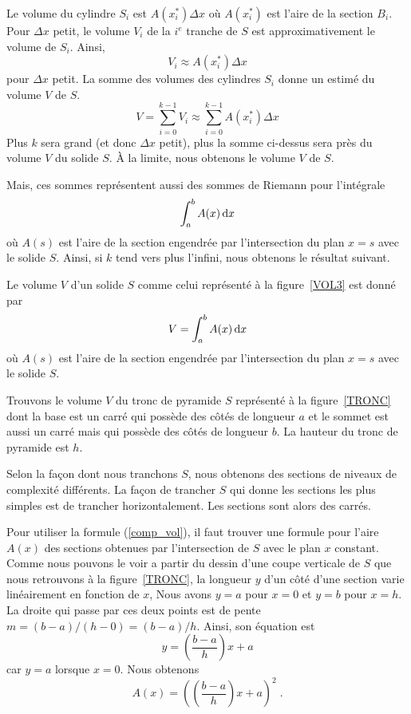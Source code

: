 {

Le volume du cylindre $S_i$ est $A(x_i^\ast) \Delta x$ où $A(x_i^\ast)$ est
l'aire de la section $B_i$.  Pour $\Delta x$ petit, le volume $V_i$ de la
$i^e$ tranche de $S$ est approximativement le volume de $S_i$.  Ainsi,
\[
V_i \approx A(x_i^\ast) \Delta x
\]
pour $\Delta x$ petit.  La somme des volumes des cylindres $S_i$ donne un
estimé du volume $V$ de $S$.
\[
V = \sum_{i=0}^{k-1} V_i \approx \sum_{i=0}^{k-1} A(x_i^\ast) \Delta x
\]
Plus $k$ sera grand (et donc $\Delta x$ petit), plus la somme ci-dessus sera
près du volume $V$ du solide $S$.  À la limite, nous obtenons le volume $V$ de
$S$.

Mais, ces sommes représentent aussi des sommes de Riemann pour l'intégrale
\[
\int_a^b A(x)\,\mathrm{d}x
\]
où $A(s)$ est l'aire de la section engendrée par l'intersection du plan $x=s$
avec le solide $S$.  Ainsi, si $k$ tend vers plus l'infini, nous
obtenons le résultat suivant.

\begin{focus}{\mth}
Le volume $V$ d'un solide $S$ comme celui représenté à la
figure~\ref{VOL3} est donné par
\begin{equation}\label{comp_vol}
V = \int_a^b A(x)\,\mathrm{d}x
\end{equation}
où $A(s)$ est l'aire de la section engendrée par l'intersection du
plan $x=s$ avec le solide $S$.
\end{focus}

\begin{egg}
Trouvons le volume $V$ du tronc de pyramide $S$ représenté à la
figure~\ref{TRONC} dont la base est un carré qui possède des côtés de
longueur $a$ et le sommet est aussi un carré mais qui possède des côtés de
longueur $b$.  La hauteur du tronc de pyramide est $h$.

Selon la façon dont nous tranchons $S$, nous obtenons des sections de
niveaux de complexité différents.  La façon de trancher $S$ qui donne
les sections les plus simples est de trancher horizontalement.  Les
sections sont alors des carrés.

Pour utiliser la formule (\ref{comp_vol}), il faut trouver une formule pour
l'aire $A(x)$ des sections obtenues par l'intersection de $S$ avec le plan
$x$ constant.  Comme nous pouvons le voir a partir du dessin d'une
coupe verticale de $S$ que nous retrouvons à la figure~\ref{TRONC}, la
longueur $y$ d'un côté d'une section varie linéairement en fonction de
$x$,  Nous avons $y=a$ pour $x=0$
et $y=b$ pour $x=h$.  La droite qui passe par ces deux points est de pente 
$m = (b-a)/(h-0) = (b-a)/h$.  Ainsi, son équation est
\[
y = \left(\frac{b-a}{h}\right) x + a
\]
car $y=a$ lorsque $x=0$.  Nous obtenons
\[
A(x) = \left( \left(\frac{b-a}{h}\right) x + a \right)^2 \; .
\]


\end{egg}}
